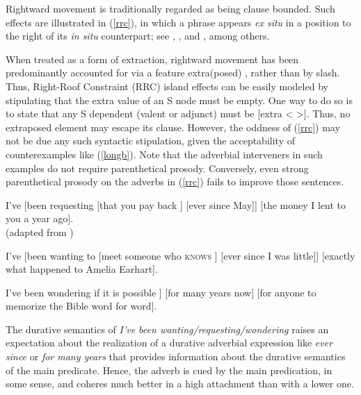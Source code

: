 \documentclass[output=paper
 	        ,biblatex
                ,babelshorthands
                ,newtxmath
                ,draftmode
                ,colorlinks, citecolor=brown
]{langscibook}
\begin{document}
Rightward movement is traditionally regarded as being clause bounded. Such
 \emph{}  \citep[Section~5.1.2]{Ross67} effects are illustrated in (\ref{rrc}), 
in which a phrase appears \emph{ex situ} in a position 
to the right of its \emph{in situ} counterpart; see   \citet{akma75}, \citet{baltin78}, and  \citet{stowelldiss}, among others.

\eal \label{rrc}
\ex[*]{It was believed \spc$_x$ that $[$there walked into the room$]$ \spc$_y$ $[$by everyone$]_x$ $[$a man with  long blond hair$]_y$].\\
\citep{rochemont}}
\zl



\noindent
When treated as a form of extraction, rightward movement has been predominantly
accounted for via a feature {\sc extra(posed)} \citep{Keller95b,Noord:Bouma:96,eynde96,
kellerverb,Mueller99a,KimSag2005}, rather than by {\sc slash}.  
Thus, Right-Roof Constraint (RRC) island effects can be easily modeled by stipulating that the  {\sc extra} value of an S node must be empty. One way to do so is to state that any S dependent (valent or adjunct) must be [{\sc extra} < >].
Thus, no extraposed element may escape its clause. However,  the oddness of (\ref{rrc}) may not be due any such syntactic stipulation, given the acceptability of counterexamples like (\ref{longb}). Note that the adverbial interveners in such examples do not  require parenthetical prosody. Conversely, even strong  parenthetical
prosody on the adverbs in (\ref{rrc}) fails to improve those sentences.


\eal \label{longb}
\ex  I've [been requesting [that you pay back \spc] [ever since May]] [the money
I lent to you a year ago].\\
  (adapted from \citealp[167]{Kayne98a-u})

\ex I've [been wanting to [meet someone
who \textsc{knows} \spc] [ever since I was little]] [exactly what happened to Amelia Earhart].

\ex  I've been wondering  if it is possible   \spc]
[for many years now] [for anyone to memorize the Bible word for word].\\
\citep[861]{chavesrnr}
\zl


\noindent
The  durative semantics  of   \emph{I've been wanting/requesting/wondering} 
 raises an expectation about the realization of   a durative  
adverbial expression like  \emph{ever since} or \emph{for many years} that
provides information about the durative semantics of the main predicate.
Hence, the adverb is cued by the main predication, in some sense, and 
  coheres much better in a high attachment than with a lower one.
\end{document}
